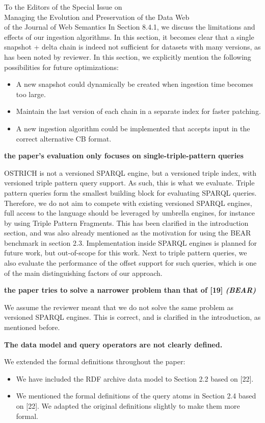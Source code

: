 \documentclass{letter}
\newcounter{section}
\begin{document}
\begin{letter}{To the Editors of the Special Issue on\\Managing the Evolution and Preservation of the Data Web\\of the Journal of Web Semantics}
In Section 8.4.1, we discuss the limitations and effects of our ingestion algorithms.
In this section, it becomes clear that a single snapshot + delta chain is indeed not sufficient for datasets with many versions,
as has been noted by reviewer.
In this section, we explicitly mention the following possibilities for future optimizations:
\begin{itemize}
    \item A new snapshot could dynamically be created when ingestion time becomes too large.
    \item Maintain the last version of each chain in a separate index for faster patching.
    \item A new ingestion algorithm could be implemented that accepts input in the correct alternative CB format.
\end{itemize}

\textbf{the paper's evaluation only focuses on single-triple-pattern queries}

OSTRICH is not a versioned SPARQL engine, but a versioned triple index,
with versioned triple pattern query support.
As such, this is what we evaluate.
Triple pattern queries form the smallest building block for evaluating SPARQL queries.
Therefore, we do not aim to compete with existing versioned SPARQL engines,
full access to the language should be leveraged by umbrella engines,
for instance by using Triple Pattern Fragments.
This has been clarified in the introduction section, and was also already mentioned as the motivation for using the BEAR benchmark in section 2.3.
Implementation inside SPARQL engines is planned for future work, but out-of-scope for this work.
Next to triple pattern queries,
we also evaluate the performance of the offset support for such queries,
which is one of the main distinguishing factors of our approach.

\textbf{the paper tries to solve a narrower problem than that of [19] \emph{(BEAR)}}

We assume the reviewer meant that we do not solve the same problem as versioned SPARQL engines.
This is correct, and is clarified in the introduction, as mentioned before.

\textbf{The data model and query operators are not clearly defined.}

We extended the formal definitions throughout the paper:
\begin{itemize}
    \item We have included the RDF archive data model to Section 2.2 based on [22].
    \item We mentioned the formal definitions of the query atoms in Section 2.4 based on [22]. We adapted the original definitions slightly to make them more formal.
\end{itemize}


\end{letter}
\end{document}
